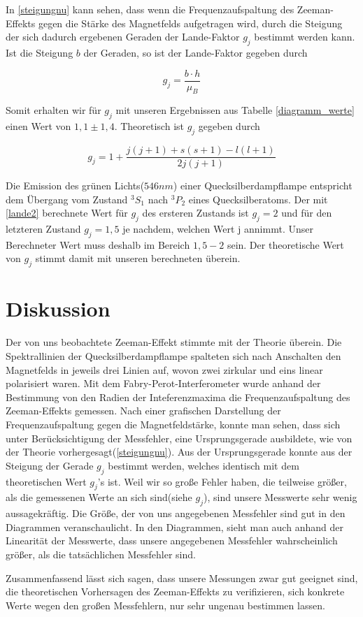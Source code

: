 \documentclass[10pt,a4paper]{article}
\begin{document}
In \ref{steigungnu} kann sehen, dass wenn die Frequenzaufspaltung des Zeeman-Effekts gegen die Stärke des Magnetfelds aufgetragen wird, durch die Steigung der sich dadurch ergebenen Geraden der Lande-Faktor $g_j$ bestimmt werden kann. Ist die Steigung $b$ der Geraden, so ist der Lande-Faktor gegeben durch

\begin{equation}
g_j = \frac{b \cdot h}{\mu_B}
\end{equation}

Somit erhalten wir für $g_j$ mit unseren Ergebnissen aus Tabelle \ref{diagramm_werte} einen Wert von $1,1 \pm 1,4$. Theoretisch ist $g_j$ gegeben durch

\begin{equation}
 g_j = 1 + \frac{j(j+1) + s(s+1) - l(l+1)}{2 j(j+1)}
 \label{lande2}
\end{equation}

Die Emission des grünen Lichts($546 nm$) einer Quecksilberdampflampe entspricht dem Übergang vom Zustand $^3S_1$ nach $^3P_2$ eines Quecksilberatoms. Der mit \ref{lande2} berechnete Wert für $g_j$ des ersteren Zustands ist $g_j = 2$ und für den letzteren Zustand $g_j =1,5$ je nachdem, welchen Wert j annimmt. Unser Berechneter Wert muss deshalb im Bereich $1,5-2$ sein. Der theoretische Wert von $g_j$ stimmt damit mit unseren berechneten überein.



\section{Diskussion}

Der von uns beobachtete Zeeman-Effekt stimmte mit der Theorie überein. Die Spektrallinien der Quecksilberdampflampe spalteten sich nach Anschalten den Magnetfelds in jeweils drei Linien auf, wovon zwei zirkular und eins linear polarisiert waren. Mit dem Fabry-Perot-Interferometer wurde anhand der Bestimmung von den Radien der Inteferenzmaxima die Frequenzaufspaltung des Zeeman-Effekts gemessen. Nach einer grafischen Darstellung der Frequenzaufspaltung gegen die Magnetfeldstärke, konnte man sehen, dass sich unter Berücksichtigung der Messfehler, eine Ursprungsgerade ausbildete, wie von der Theorie vorhergesagt(\ref{steigungnu}). Aus der Ursprungsgerade konnte aus der Steigung der Gerade $g_j$ bestimmt werden, welches identisch mit dem theoretischen Wert $g_j$'s ist. Weil wir so große Fehler haben, die teilweise größer, als die gemessenen Werte an sich sind(siehe $g_j$), sind unsere Messwerte sehr wenig aussagekräftig. Die Größe, der von uns angegebenen Messfehler sind gut in den Diagrammen veranschaulicht. In den Diagrammen, sieht man auch anhand der Linearität der Messwerte, dass unsere angegebenen Messfehler wahrscheinlich größer, als die tatsächlichen Messfehler sind.


Zusammenfassend lässt sich sagen, dass unsere Messungen zwar gut geeignet sind, die theoretischen Vorhersagen des Zeeman-Effekts zu verifizieren, sich konkrete Werte wegen den großen Messfehlern, nur sehr ungenau bestimmen lassen.
\end{document}
